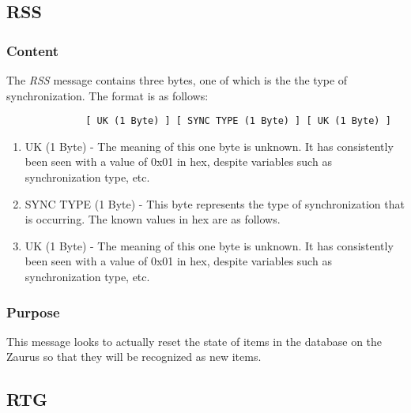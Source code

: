         \subsection{RSS}

            \subsubsection{Content}

            The \emph{RSS} message contains three bytes, one of which is the
            the type of synchronization. The format is as follows:

            \begin{verbatim}
              [ UK (1 Byte) ] [ SYNC TYPE (1 Byte) ] [ UK (1 Byte) ]
            \end{verbatim}

            \begin{enumerate}
            \item UK (1 Byte) - The meaning of this one byte is unknown. It
              has consistently been seen with a value of 0x01 in hex, despite
              variables such as synchronization type, etc.

            \item SYNC TYPE (1 Byte) - This byte represents the type of
              synchronization that is occurring. The known values in hex are
              as follows.

              \synctypes

            \item UK (1 Byte) - The meaning of this one byte is unknown. It
              has consistently been seen with a value of 0x01 in hex, despite
              variables such as synchronization type, etc.

            \end{enumerate}            

            \subsubsection{Purpose}

            This message looks to actually reset the state of items in the
            database on the Zaurus so that they will be recognized as new
            items.

        \subsection{RTG}

